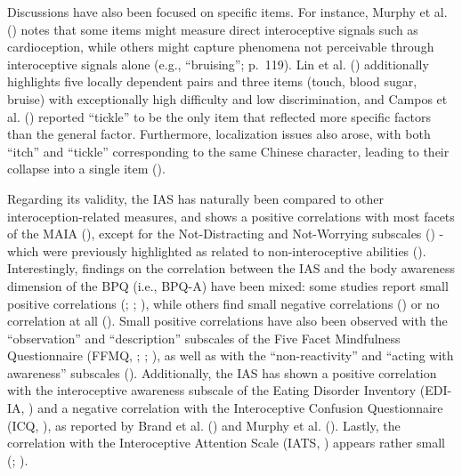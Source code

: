 \documentclass[
  jou,
  floatsintext,
  longtable,
  nolmodern,
  notxfonts,
  notimes,
  colorlinks=true,linkcolor=blue,citecolor=blue,urlcolor=blue]{apa7}
\begin{document}
Discussions have also been focused on specific items. For instance,
Murphy et al. () notes that some items
might measure direct interoceptive signals such as cardioception, while
others might capture phenomena not perceivable through interoceptive
signals alone (e.g., ``bruising''; p.~119). Lin et al.
() additionally highlights five locally
dependent pairs and three items (touch, blood sugar, bruise) with
exceptionally high difficulty and low discrimination, and Campos et al.
() reported ``tickle'' to be the only
item that reflected more specific factors than the general factor.
Furthermore, localization issues also arose, with both ``itch'' and
``tickle'' corresponding to the same Chinese character, leading to their
collapse into a single item ().

Regarding its validity, the IAS has naturally been compared to other
interoception-related measures, and shows a positive correlations with
most facets of the MAIA
(),
except for the Not-Distracting and Not-Worrying subscales
() - which were previously
highlighted as related to non-interoceptive abilities
().
Interestingly, findings on the correlation between the IAS and the body
awareness dimension of the BPQ (i.e., BPQ-A) have been mixed: some
studies report small positive correlations
(;
;
), while others find
small negative correlations ()
or no correlation at all (). Small positive correlations have also been observed with the
``observation'' and ``description'' subscales of the Five Facet
Mindfulness Questionnaire (FFMQ, ; ;
), as well as with the
``non-reactivity'' and ``acting with awareness'' subscales
(). Additionally, the IAS
has shown a positive correlation with the interoceptive awareness
subscale of the Eating Disorder Inventory (EDI-IA,
) and a negative correlation
with the Interoceptive Confusion Questionnaire (ICQ,
), as reported
by Brand et al. () and Murphy et al.
(). Lastly, the correlation with the
Interoceptive Attention Scale (IATS,
) appears
rather small (;
).
\end{document}
